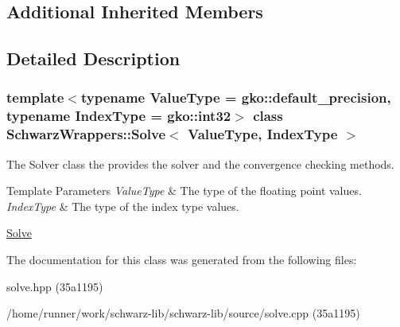 \subsection*{Additional Inherited Members}


\subsection{Detailed Description}
\subsubsection*{template$<$typename Value\+Type = gko\+::default\+\_\+precision, typename Index\+Type = gko\+::int32$>$\newline
class Schwarz\+Wrappers\+::\+Solve$<$ Value\+Type, Index\+Type $>$}

The Solver class the provides the solver and the convergence checking methods. 


\begin{DoxyTemplParams}{Template Parameters}
{\em Value\+Type} & The type of the floating point values. \\
\hline
{\em Index\+Type} & The type of the index type values.\\
\hline
\end{DoxyTemplParams}
\hyperlink{group__solve}{Solve} 

The documentation for this class was generated from the following files\+:\begin{DoxyCompactItemize}
\item 
solve.\+hpp (35a1195)\item 
/home/runner/work/schwarz-\/lib/schwarz-\/lib/source/solve.\+cpp (35a1195)\end{DoxyCompactItemize}
